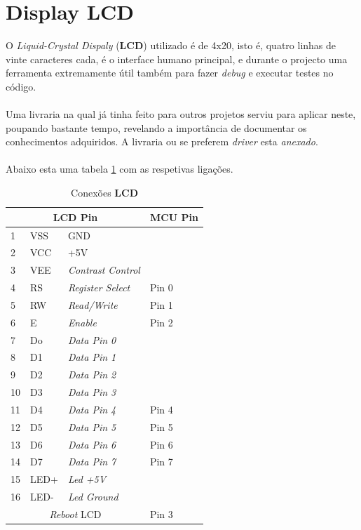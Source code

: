 \section{Display LCD}
O \textit{Liquid-Crystal Dispaly} (\textbf{LCD}) utilizado é de 4x20, isto é, quatro linhas de vinte caracteres cada, é o interface humano principal, e durante o projecto uma ferramenta extremamente útil também para fazer \textit{debug} e executar testes no código.
\\
\\
Uma livraria na qual já tinha feito para outros projetos serviu para aplicar neste, poupando bastante tempo, revelando a importância de documentar os conhecimentos adquiridos. A livraria ou se preferem \textit{driver} esta \textit{anexado}.
\\
\\
Abaixo esta uma tabela \ref{LCD_connections} com as respetivas ligações.
\begin{table}[H]
	\centering
	\caption{Conexões \textbf{LCD}}
	\begin{tabular}{||p{1cm} p{2cm} p{4cm} | p{1cm}||} 
		\hline
		\multicolumn{3}{||c|}{\textbf{LCD Pin}} & \multicolumn{1}{|c||}{\textbf{MCU Pin}}\\ [1ex]
		\hline
		1 & VSS & GND & \\
		2 & VCC & +5V & \\
		3 & VEE & \textit{Contrast Control} & \\
		4 & RS & \textit{Register Select} & Pin 0 \\
		5 & RW & \textit{Read/Write} & Pin 1 \\
		6 & E & \textit{Enable} & Pin 2 \\
		7 & Do & \textit{Data Pin 0} & \\
		8 & D1 & \textit{Data Pin 1} & \\
		9 & D2 & \textit{Data Pin 2} & \\
		10 & D3 & \textit{Data Pin 3} & \\
		11 & D4 & \textit{Data Pin 4} & Pin 4 \\
		12 & D5 & \textit{Data Pin 5} & Pin 5 \\
		13 & D6 & \textit{Data Pin 6} & Pin 6 \\
		14 & D7 & \textit{Data Pin 7} & Pin 7 \\
		15 & LED+ & \textit{Led +5V} &  \\
		16 & LED- & \textit{Led Ground} & \\
		\multicolumn{3}{||c|}{\textit{Reboot} LCD} & \multicolumn{1}{|l||}{Pin 3}\\ [1ex]
		\hline
	\end{tabular}	
	\label{LCD_connections}
\end{table}
